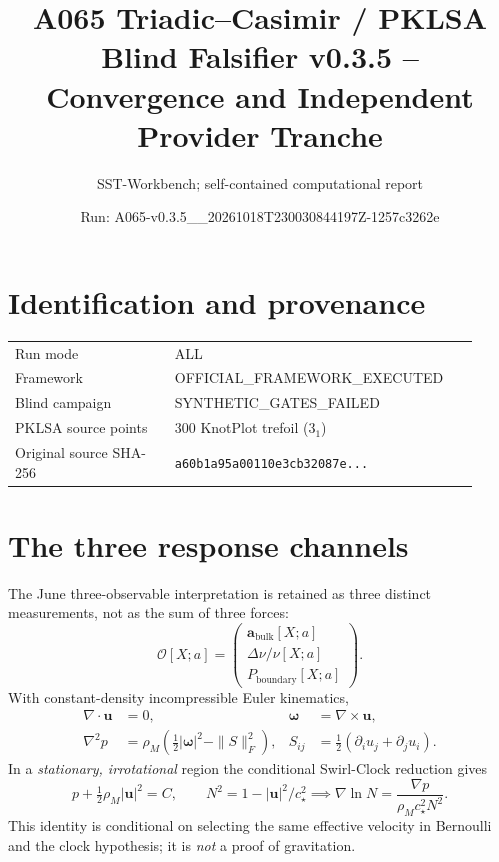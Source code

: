 \documentclass[10pt,a4paper]{article}
\title{A065 Triadic--Casimir / PKLSA\\ Blind Falsifier v0.3.5 -- Convergence and Independent Provider Tranche}
\author{SST-Workbench; self-contained computational report}
\date{Run: A065-v0.3.5\_\_20261018T230030844197Z-1257c3262e}
\begin{document}
\maketitle
\begin{center}
\end{center}
\section{Identification and provenance}
\begin{tabular}{@{}p{0.32\linewidth}p{0.60\linewidth}@{}}
\toprule
Run mode & ALL \\
Framework & OFFICIAL\_FRAMEWORK\_EXECUTED \\
Blind campaign & SYNTHETIC\_GATES\_FAILED \\
PKLSA source points & 300 KnotPlot trefoil ($3_1$) \\
Original source SHA-256 & \texttt{a60b1a95a00110e3cb32087e...} \\
\bottomrule
\end{tabular}
\section{The three response channels}
The June three-observable interpretation is retained as three distinct measurements, not as the sum of three forces:
\[
\mathcal O[X;a]=\begin{pmatrix}
\mathbf a_{\mathrm{bulk}}[X;a]\\
\Delta\nu/\nu[X;a]\\
P_{\mathrm{boundary}}[X;a]
\end{pmatrix}.
\]
With constant-density incompressible Euler kinematics,
\begin{align}
\nabla\cdot\mathbf u&=0,&
\boldsymbol\omega&=\nabla\times\mathbf u,\\
\nabla^2p&=\rho_M\left(\tfrac12|\boldsymbol\omega|^2-\|S\|_F^2\right),&
S_{ij}&=\tfrac12(\partial_i u_j+\partial_j u_i).
\end{align}
In a \emph{stationary, irrotational} region the conditional Swirl-Clock reduction gives
\[
p+\tfrac12\rho_M|\mathbf u|^2=C,\qquad
N^2=1-|\mathbf u|^2/c_\star^2
\implies\nabla\ln N=\frac{\nabla p}{\rho_Mc_\star^2N^2}.
\]
This identity is conditional on selecting the same effective velocity in Bernoulli and the clock hypothesis; it is \emph{not} a proof of gravitation.
\end{document}
